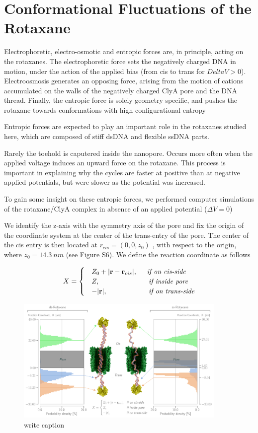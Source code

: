 \section{Conformational Fluctuations of the Rotaxane}

Electrophoretic, electro-osmotic and entropic forces are, in principle, acting on the
rotaxanes. The electrophoretic force sets the negatively charged DNA in motion, under the
action of the applied bias (from cis to trans for $Delta V > 0$). Electroosmosis
generates an opposing force, arising from the motion of cations accumulated on the walls
of the negatively charged ClyA pore and the DNA thread. Finally, the entropic force is
solely geometry specific, and pushes the rotaxane towards conformations with high
configurational entropy

Entropic forces are expected to play an important role in the rotaxanes studied here,
which are composed of stiff dsDNA and flexible ssDNA parts.

Rarely the toehold is caputered inside the nanopore. Occurs more often when the applied
voltage induces an upward force on the rotaxane. This process is important in explaining
why the cycles are faster at positive than at negative applied potentials, but were
slower as the potential was increased.

To gain some insight on these entropic forces, we performed computer simulations of the
rotaxane/ClyA complex in absence of an applied potential ($\Delta V = 0$)

We identify the z-axis with the symmetry axis of the pore and fix the origin of the
coordinate system at the center of the trans-entry of the pore. The center of the cis
entry is then located at $r_{cis} = (0, 0, z_{0})$ , with respect to the origin,
where $z_0 = 14.3\ nm$ (see Figure S6). We define the reaction coordinate as follows

\begin{equation}
  X = \begin{cases}
        &Z_0 + |\textbf{r} - \textbf{r}_{cis}|, \hspace{0.5cm} \textit{if on cis-side}\\
        &Z, \hspace{2.5cm} \textit{if inside pore}\\
        &-|\textbf{r}|, \hspace{2.11cm} \textit{if on trans-side}
      \end{cases}
\end{equation}


\begin{figure}
\begin{center}
  \includegraphics[width=0.90\textwidth]{Figures/RotaxaneFluctuations.png}
  \caption{write caption}
\end{center}
\end{figure}
